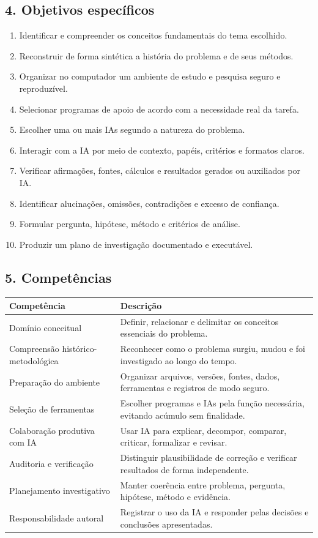 \documentclass[11pt,a4paper]{article}
\begin{document}
\subsection*{4. Objetivos específicos}

\begin{enumerate}
\item Identificar e compreender os conceitos fundamentais do tema escolhido.
\item Reconstruir de forma sintética a história do problema e de seus métodos.
\item Organizar no computador um ambiente de estudo e pesquisa seguro e reproduzível.
\item Selecionar programas de apoio de acordo com a necessidade real da tarefa.
\item Escolher uma ou mais IAs segundo a natureza do problema.
\item Interagir com a IA por meio de contexto, papéis, critérios e formatos claros.
\item Verificar afirmações, fontes, cálculos e resultados gerados ou auxiliados por IA.
\item Identificar alucinações, omissões, contradições e excesso de confiança.
\item Formular pergunta, hipótese, método e critérios de análise.
\item Produzir um plano de investigação documentado e executável.
\end{enumerate}

\subsection*{5. Competências}

{\small
\begin{tabular}{|p{}|p{}|}
\hline
\textbf{Competência} & \textbf{Descrição} \\
\hline
Domínio conceitual & Definir, relacionar e delimitar os conceitos essenciais do problema. \\
\hline
Compreensão histórico-metodológica & Reconhecer como o problema surgiu, mudou e foi investigado ao longo do tempo. \\
\hline
Preparação do ambiente & Organizar arquivos, versões, fontes, dados, ferramentas e registros de modo seguro. \\
\hline
Seleção de ferramentas & Escolher programas e IAs pela função necessária, evitando acúmulo sem finalidade. \\
\hline
Colaboração produtiva com IA & Usar IA para explicar, decompor, comparar, criticar, formalizar e revisar. \\
\hline
Auditoria e verificação & Distinguir plausibilidade de correção e verificar resultados de forma independente. \\
\hline
Planejamento investigativo & Manter coerência entre problema, pergunta, hipótese, método e evidência. \\
\hline
Responsabilidade autoral & Registrar o uso da IA e responder pelas decisões e conclusões apresentadas. \\
\hline
\end{tabular}
}
\end{document}
